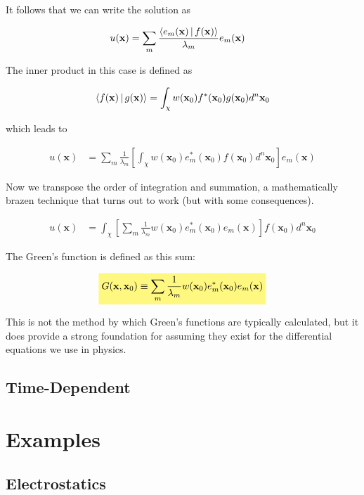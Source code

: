 \documentclass[11pt]{article}
\theoremstyle{plain}
\theoremstyle{definition}
\renewcommand{\vec}[1]{\mathbf{#1}} %
\newcommand{\highlight}[1]{%
  \colorbox{yellow!50}{$\displaystyle#1$}}
\begin{document}
It follows that we can write the solution as

\begin{align}
    u(\vec x) &= \sum\limits_m \frac{\Braket{e_m(\vec x) | f(\vec x)}}{\lambda_m} e_m(\vec x)
\end{align}

The inner product in this case is defined as

\begin{align}
    \Braket{f(\vec x)|g(\vec x)} = \int_{\chi} w(\vec x_0) f^*(\vec x_0) g(\vec x_0) d^n\vec x_0
\end{align}

which leads to

\begin{align}
    u(\vec x) &= \sum\limits_m \frac{1}{\lambda_m} \left[ \int_{\chi} w(\vec x_0) e_m^*(\vec x_0) f(\vec x_0) d^n\vec x_0 \right] e_m(\vec x)
\end{align}

Now we transpose the order of integration and summation, a mathematically brazen technique that turns out to work (but with some consequences).

\begin{align}
u(\vec x) &= \int_{\chi} \left[ \sum\limits_m \frac{1}{\lambda_m} w(\vec x_0) e_m^*(\vec x_0) e_m(\vec x) \right] f(\vec x_0) d^n\vec x_0
\end{align}

The Green's function is defined as this sum:

\begin{align}
    \highlight{G(\vec x,\vec x_0) \equiv \sum\limits_m \frac{1}{\lambda_m} w(\vec x_0) e_m^*(\vec x_0) e_m(\vec x)}
\end{align}

This is not the method by which Green's functions are typically calculated, but it does provide a strong foundation for assuming they exist for the differential equations we use in physics.

\subsection{Time-Dependent}

\section{Examples}
\subsection{Electrostatics}
\end{document}
